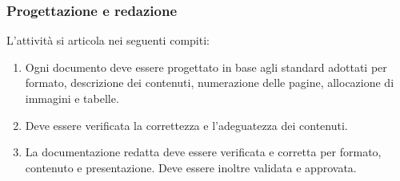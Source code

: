\subsubsection{Progettazione e redazione}
L'attività si articola nei seguenti compiti:
\begin{enumerate}
    \item Ogni documento deve essere progettato in base agli standard adottati per formato, descrizione dei contenuti, numerazione delle pagine, allocazione di immagini e tabelle.
    \item Deve essere verificata la correttezza e l'adeguatezza dei contenuti.
    \item La documentazione redatta deve essere verificata e corretta per formato, contenuto e presentazione. Deve essere inoltre validata e approvata.
\end{enumerate}
